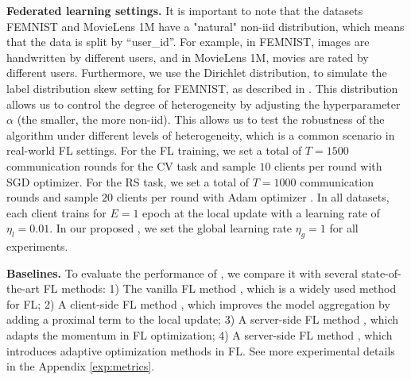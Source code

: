 \textbf{Federated learning settings.}
It is important to note that the datasets FEMNIST and MovieLens 1M have a "natural" non-iid distribution, which means that the data is split by ``user\_id''. For example, in FEMNIST, images are handwritten by different users, and in MovieLens 1M, movies are rated by different users. Furthermore, we use the Dirichlet distribution, to simulate the label distribution skew setting for FEMNIST, as described in \cite{hsu2019measuring}. This distribution allows us to control the degree of heterogeneity by adjusting the hyperparameter $\alpha$ (the smaller, the more non-iid). This allows us to test the robustness of the algorithm under different levels of heterogeneity, which is a common scenario in real-world FL settings. For the FL training, we set a total of $T=1500$ communication rounds for the CV task and sample $10$ clients per round with SGD optimizer. For the RS task, we set a total of $T=1000$ communication rounds and sample $20$ clients per round with Adam optimizer \cite{kingma2014adam}. In all datasets, each client trains for $E=1$ epoch at the local update with a learning rate of $\eta_l=0.01$. In our proposed \fedeve, we set the global learning rate $\eta_g=1$ for all experiments.

\textbf{Baselines.}
To evaluate the performance of \fedeve, we compare it with several state-of-the-art FL methods: 1) The vanilla FL method \fedavg \cite{mcmahan2017communication}, which is a widely used method for FL; 2) A client-side FL method \fedprox \cite{li2020federated}, which improves the model aggregation by adding a proximal term to the local update; 3) A server-side FL method \fedavgm \cite{hsu2019measuring}, which adapts the momentum in FL optimization; 4) A server-side FL method \fedopt \cite{reddi2020adaptive}, which introduces adaptive optimization methods in FL. See more experimental details in the Appendix \ref{exp:metrics}. 



